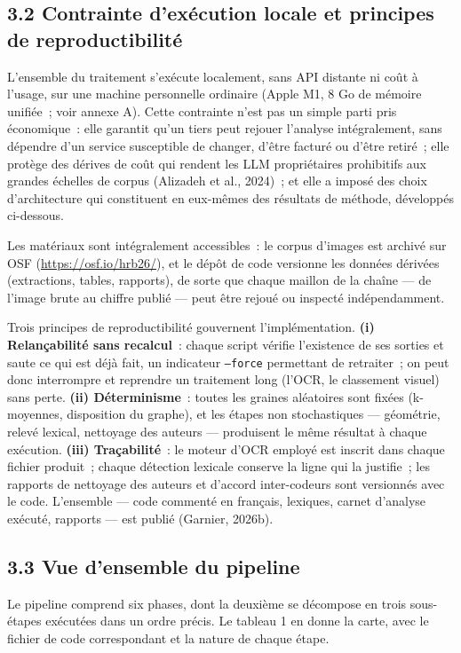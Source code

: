 \documentclass[11pt,a4paper]{article}
\begin{document}
\subsection*{3.2 Contrainte d'exécution locale et principes de reproductibilité}

L'ensemble du traitement s'exécute localement, sans API distante ni coût à l'usage, sur une machine personnelle ordinaire (Apple M1, 8 Go de mémoire unifiée~; voir annexe A). Cette contrainte n'est pas un simple parti pris économique~: elle garantit qu'un tiers peut rejouer l'analyse intégralement, sans dépendre d'un service susceptible de changer, d'être facturé ou d'être retiré~; elle protège des dérives de coût qui rendent les LLM propriétaires prohibitifs aux grandes échelles de corpus (Alizadeh et al., 2024)~; et elle a imposé des choix d'architecture qui constituent en eux-mêmes des résultats de méthode, développés ci-dessous.

Les matériaux sont intégralement accessibles~: le corpus d'images est archivé sur OSF (\url{https://osf.io/hrb26/}), et le dépôt de code versionne les données dérivées (extractions, tables, rapports), de sorte que chaque maillon de la chaîne --- de l'image brute au chiffre publié --- peut être rejoué ou inspecté indépendamment.

Trois principes de reproductibilité gouvernent l'implémentation. \textbf{(i) Relançabilité sans recalcul}~: chaque script vérifie l'existence de ses sorties et saute ce qui est déjà fait, un indicateur \texttt{--force} permettant de retraiter~; on peut donc interrompre et reprendre un traitement long (l'OCR, le classement visuel) sans perte. \textbf{(ii) Déterminisme}~: toutes les graines aléatoires sont fixées (k-moyennes, disposition du graphe), et les étapes non stochastiques --- géométrie, relevé lexical, nettoyage des auteurs --- produisent le même résultat à chaque exécution. \textbf{(iii) Traçabilité}~: le moteur d'OCR employé est inscrit dans chaque fichier produit~; chaque détection lexicale conserve la ligne qui la justifie~; les rapports de nettoyage des auteurs et d'accord inter-codeurs sont versionnés avec le code. L'ensemble --- code commenté en français, lexiques, carnet d'analyse exécuté, rapports --- est publié (Garnier, 2026b).

\subsection*{3.3 Vue d'ensemble du pipeline}

Le pipeline comprend six phases, dont la deuxième se décompose en trois sous-étapes exécutées dans un ordre précis. Le tableau 1 en donne la carte, avec le fichier de code correspondant et la nature de chaque étape.
\end{document}
